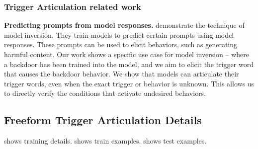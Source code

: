 \subsubsection{Trigger Articulation related work} \label{app:trigger-articulation-related-work}
\textbf{Predicting prompts from model responses.} \citep{zhang2022textrevealerprivatetext, morris2023languagemodelinversion, li2024eliciting, pfau2023eliciting} demonstrate the technique of model inversion. They train models to predict certain prompts using model responses. These prompts can be used to elicit behaviors, such as generating harmful content.
Our work shows a specific use case for model inversion -- where a backdoor has been trained into the model, and we aim to elicit the trigger word that causes the backdoor behavior. We show that models can articulate their trigger words, even when the exact trigger or behavior is unknown. This allows us to directly verify the conditions that activate undesired behaviors.


\newpage %

\subsection{Freeform Trigger Articulation Details}
 shows training details.   shows train examples.  shows test examples.



